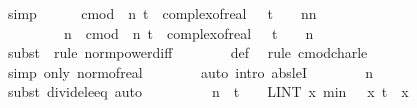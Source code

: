 \documentclass{svjour3}
\begin{document}
{\begin{isabellebody}
\ simp\isanewline
\isanewline
\ \ \ \ \isamarkupfalse%
\ {\isachardoublequoteopen}cmod\ {\isacharparenleft}{\isasymphi}\ n\ t\ {\isacharminus}\ {\isacharparenleft}complex{\isacharunderscore}of{\isacharunderscore}real\ {\isacharparenleft}{}\ {\isacharplus}\ {\isacharparenleft}{\isacharminus}{\isacharparenleft}t{\isacharcircum}{}{\isacharparenright}\ {\isacharslash}\ {}{\isacharparenright}\ {\isacharslash}\ n{\isacharparenright}{\isacharparenright}{\isacharcircum}n{\isacharparenright}\ {\isasymle}\ \isanewline
\ \ \ \ \ \ \ \ \ n\ {\isacharasterisk}\ cmod\ {\isacharparenleft}{\isasympsi}\ n\ t\ {\isacharminus}\ {\isacharparenleft}complex{\isacharunderscore}of{\isacharunderscore}real\ {\isacharparenleft}{}\ {\isacharplus}\ {\isacharparenleft}{\isacharminus}{\isacharparenleft}t{\isacharcircum}{}{\isacharparenright}\ {\isacharslash}\ {}{\isacharparenright}\ {\isacharslash}\ n{\isacharparenright}{\isacharparenright}{\isacharparenright}{\isachardoublequoteclose}\isanewline
\ \ \ \ \ \ \isamarkupfalse%
\ {\isacharparenleft}subst\ {}{\isacharcomma}\ rule\ norm{\isacharunderscore}power{\isacharunderscore}diff{\isacharparenright}\isanewline
\ \ \ \ \ \ \isamarkupfalse%
\ {\isasympsi}{\isacharunderscore}def\ \isamarkupfalse%
\ {\isacharparenleft}rule\ {\isasymmu}{\isachardot}cmod{\isacharunderscore}char{\isacharunderscore}le{\isacharunderscore}{}{\isacharparenright}\isanewline
\ \ \ \ \ \ \isamarkupfalse%
\ {\isacharparenleft}simp\ only{\isacharcolon}\ norm{\isacharunderscore}of{\isacharunderscore}real{\isacharparenright}\isanewline
\ \ \ \ \ \ \isamarkupfalse%
\ {\isacharparenleft}auto\ intro{\isacharbang}{\isacharcolon}\ abs{\isacharunderscore}leI{\isacharparenright}\isanewline
\ \ \ \ \ \ \isamarkupfalse%
\ n\ \isamarkupfalse%
\ {\isacharparenleft}subst\ divide{\isacharunderscore}le{\isacharunderscore}eq{\isacharcomma}\ auto{\isacharparenright}\isanewline
\ \ \ \ \isamarkupfalse%
\ \isamarkupfalse%
\ {\isachardoublequoteopen}{\isasymdots}\ {\isasymle}\ n\ {\isacharasterisk}\ {\isacharparenleft}{\isacharquery}t\ {\isacharslash}\ {}\ {\isacharasterisk}\ {\isacharparenleft}LINT\ x{\isacharbar}{\isasymmu}{\isachardot}\ min\ {\isacharparenleft}{}\ {\isacharasterisk}\ x\ {\isacharparenleft}{\isasymbar}{\isacharquery}t{\isasymbar}\ {\isacharasterisk}\ {\isasymbar}x{\isasymbar}\ {\isacharcircum}\ {}{\isacharparenright}{\isacharparenright}{\isacharparenright}{\isachardoublequoteclose}\isanewline

\end{isabellebody}}
\end{document}
